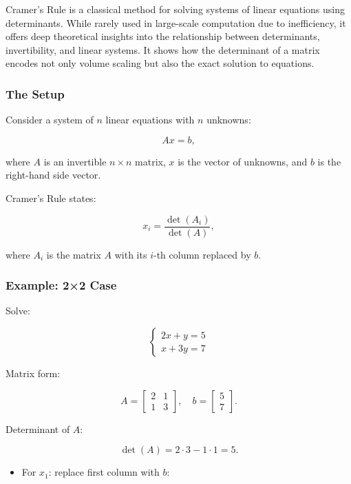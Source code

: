 \documentclass[
  letterpaper,
  DIV=11,
  numbers=noendperiod]{scrreprt}
\providecommand{\tightlist}{%
  \setlength{\itemsep}{0pt}\setlength{\parskip}{0pt}}
\begin{document}
Cramer's Rule is a classical method for solving systems of linear
equations using determinants. While rarely used in large-scale
computation due to inefficiency, it offers deep theoretical insights
into the relationship between determinants, invertibility, and linear
systems. It shows how the determinant of a matrix encodes not only
volume scaling but also the exact solution to equations.

\subsubsection{The Setup}\label{the-setup-1}

Consider a system of \(n\) linear equations with \(n\) unknowns:

\[
Ax = b,
\]

where \(A\) is an invertible \(n \times n\) matrix, \(x\) is the vector
of unknowns, and \(b\) is the right-hand side vector.

Cramer's Rule states:

\[
x_i = \frac{\det(A_i)}{\det(A)},
\]

where \(A_i\) is the matrix \(A\) with its \(i\)-th column replaced by
\(b\).

\subsubsection{Example: 2×2 Case}\label{example-22-case-2}

Solve:

\[
\begin{cases} 
2x + y = 5 \\ 
x + 3y = 7 
\end{cases}
\]

Matrix form:

\[
A = \begin{bmatrix} 2 & 1 \\ 1 & 3 \end{bmatrix}, \quad b = \begin{bmatrix} 5 \\ 7 \end{bmatrix}.
\]

Determinant of \(A\):

\[
\det(A) = 2\cdot 3 - 1\cdot 1 = 5.
\]

\begin{itemize}
\tightlist
\item
  For \(x_1\): replace first column with \(b\):
\end{itemize}
\end{document}
